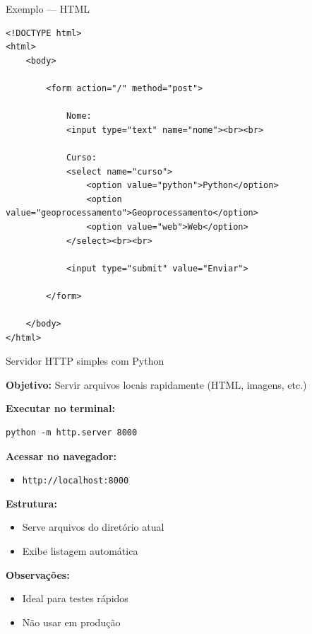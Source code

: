 \documentclass{beamer}
\begin{document}
\begin{frame}[fragile]{Exemplo — HTML}
    
    \begin{verbatim}
<!DOCTYPE html>
<html>
    <body>
    
        <form action="/" method="post">
        
            Nome:
            <input type="text" name="nome"><br><br>
            
            Curso:
            <select name="curso">
                <option value="python">Python</option>
                <option value="geoprocessamento">Geoprocessamento</option>
                <option value="web">Web</option>
            </select><br><br>
            
            <input type="submit" value="Enviar">
        
        </form>
    
    </body>
</html>
    \end{verbatim}
    
\end{frame}

\begin{frame}[fragile]{Servidor HTTP simples com Python}

\textbf{Objetivo:} Servir arquivos locais rapidamente (HTML, imagens, etc.)

\vspace{0.3cm}

\textbf{Executar no terminal:}

\begin{verbatim}
python -m http.server 8000
\end{verbatim}

\vspace{0.3cm}

\textbf{Acessar no navegador:}

\begin{itemize}
    \item \texttt{http://localhost:8000}
\end{itemize}

\vspace{0.3cm}

\textbf{Estrutura:}
\begin{itemize}
    \item Serve arquivos do diretório atual
    \item Exibe listagem automática
\end{itemize}

\vspace{0.3cm}

\textbf{Observações:}
\begin{itemize}
    \item Ideal para testes rápidos
    \item Não usar em produção
\end{itemize}

\end{frame}
\end{document}
